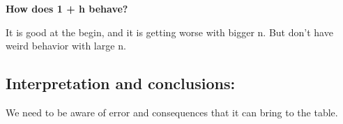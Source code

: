 \documentclass{article}
\begin{document}
\begin{center}
    \textbf{How does 1 + h behave?}
\end{center}

It is good at the begin, and it is getting worse with bigger n. But don't have weird behavior with large n.

\subsection*{Interpretation and conclusions:}
We need to be aware of error and consequences that it can bring to the table. 
\end{document}
